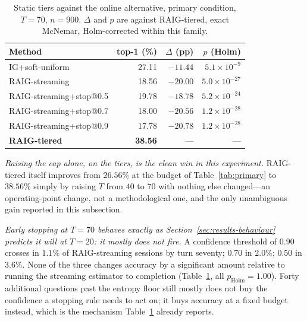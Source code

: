 \begin{table}[t]
\caption{Static tiers against the online alternative, primary condition,
$T=70$, $n=900$. $\Delta$ and $p$ are against RAIG-tiered, exact McNemar,
Holm-corrected within this family.}
\label{tab:streaming}
\centering
\footnotesize
\begin{tabular}{@{}lrrr@{}}
\toprule
\textbf{Method} & \textbf{top-1 (\%)} & \textbf{$\Delta$ (pp)} & \textbf{$p$ (Holm)} \\
\midrule
IG+soft-uniform            & 27.11 & $-11.44$ & $5.1\times10^{-9}$  \\
RAIG-streaming             & 18.56 & $-20.00$ & $5.0\times10^{-27}$ \\
RAIG-streaming+stop@0.5    & 19.78 & $-18.78$ & $5.2\times10^{-24}$ \\
RAIG-streaming+stop@0.7    & 18.00 & $-20.56$ & $1.2\times10^{-28}$ \\
RAIG-streaming+stop@0.9    & 17.78 & $-20.78$ & $1.2\times10^{-28}$ \\
\textbf{RAIG-tiered}       & \textbf{38.56} & --- & --- \\
\bottomrule
\end{tabular}
\end{table}

\emph{Raising the cap alone, on the tiers, is the clean win in this
experiment.} RAIG-tiered itself improves from $26.56\%$ at the budget of
Table~\ref{tab:primary} to $38.56\%$ simply by raising $T$ from $40$ to $70$
with nothing else changed---an operating-point change, not a methodological
one, and the only unambiguous gain reported in this subsection.

\emph{Early stopping at $T=70$ behaves exactly as
Section~\ref{sec:results-behaviour} predicts it will at $T=20$: it mostly
does not fire.} A confidence threshold of $0.90$ crosses in $1.1\%$ of
RAIG-streaming sessions by turn seventy; $0.70$ in $2.0\%$; $0.50$ in $3.6\%$.
None of the three changes accuracy by a significant amount relative to
running the streaming estimator to completion (Table~\ref{tab:streaming}, all
$p_{\text{Holm}} = 1.00$). Forty additional questions past the entropy floor
still mostly does not buy the confidence a stopping rule needs to act on; it
buys accuracy at a fixed budget instead, which is the mechanism
Table~\ref{tab:streaming} already reports.

